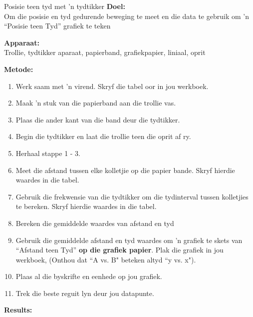 \begin{f_experiment}{Posisie teen tyd met 'n tydtikker}
            \nopagebreak
\textbf{Doel:}\\
Om die posisie en tyd gedurende beweging te meet en die data te gebruik om 'n ``Posisie teen Tyd'' grafiek te teken \par

\textbf{Apparaat:}\\
Trollie, tydtikker aparaat, papierband, grafiekpapier, liniaal, oprit \par
\textbf{Metode:}
\begin{enumerate}[noitemsep, label=\textbf{\arabic*}. ] 
    \item Werk saam met 'n virend. Skryf die tabel oor in jou werkboek.
    \item Maak 'n stuk van die papierband aan die trollie vas.
    \item Plaas die ander kant van die band deur die tydtikker.
    \item Begin die tydtikker en laat die trollie teen die oprit af ry.
    \item Herhaal stappe 1 - 3.
    \item Meet die afstand tussen elke kolletjie op die papier bande. Skryf hierdie waardes in die tabel.
    \item Gebruik die frekwensie van die tydtikker om die tydinterval tussen kolletjies te bereken. Skryf hierdie waardes in die tabel. 
    \item Bereken die gemiddelde waardes van afstand en tyd
    \item Gebruik die gemiddelde afstand en tyd waardes om 'n grafiek te skets van ``Afstand teen Tyd'' \textbf{op die grafiek papier}. Plak die grafiek in jou werkboek, (Onthou dat ``A vs. B" beteken altyd ``y vs. x").
    \item Plaas al die byskrifte en eenhede op jou grafiek.
    \item Trek die beste reguit lyn deur jou datapunte.
\end{enumerate}
        \par 
        \label{m38795*id7141045}
          \textbf{Results:}\\
        \par 
          \begin{table}[H]
        \begin{center}

\end{center}
\end{table}
\end{f_experiment}
